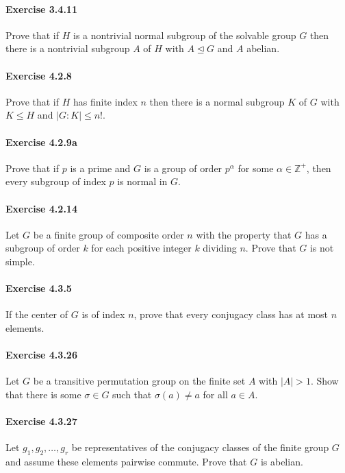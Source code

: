 \documentclass{article}
\begin{document}
\paragraph{Exercise 3.4.11} Prove that if $H$ is a nontrivial normal subgroup of the solvable group $G$ then there is a nontrivial subgroup $A$ of $H$ with $A \unlhd G$ and $A$ abelian.

\paragraph{Exercise 4.2.8} Prove that if $H$ has finite index $n$ then there is a normal subgroup $K$ of $G$ with $K \leq H$ and $|G: K| \leq n!$.

\paragraph{Exercise 4.2.9a} Prove that if $p$ is a prime and $G$ is a group of order $p^{\alpha}$ for some $\alpha \in \mathbb{Z}^{+}$, then every subgroup of index $p$ is normal in $G$.

\paragraph{Exercise 4.2.14} Let $G$ be a finite group of composite order $n$ with the property that $G$ has a subgroup of order $k$ for each positive integer $k$ dividing $n$. Prove that $G$ is not simple.

\paragraph{Exercise 4.3.5} If the center of $G$ is of index $n$, prove that every conjugacy class has at most $n$ elements.

\paragraph{Exercise 4.3.26} Let $G$ be a transitive permutation group on the finite set $A$ with $|A|>1$. Show that there is some $\sigma \in G$ such that $\sigma(a) \neq a$ for all $a \in A$.

\paragraph{Exercise 4.3.27} Let $g_{1}, g_{2}, \ldots, g_{r}$ be representatives of the conjugacy classes of the finite group $G$ and assume these elements pairwise commute. Prove that $G$ is abelian.
\end{document}
